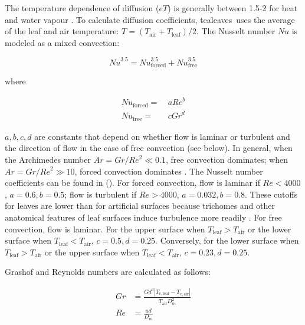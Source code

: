 \documentclass[11pt, oneside]{article}
\newcommand{\pkg}[1]{{\fontseries{b}\selectfont #1}}
\newcommand{\tealeaves}{\pkg{tealeaves}}
\begin{document}
The temperature dependence of diffusion ($\mathit{eT}$) is generally between 1.5-2 for heat and water vapour \citep{Monteith_Unsworth_2013}. To calculate diffusion coefficients, \tealeaves~uses the average of the leaf and air temperature: $T = (T_\mathrm{air} + T_\mathrm{leaf}) / 2$. The Nusselt number $\mathit{Nu}$ is modeled as a mixed convection:

\begin{equation}
  \label{eq:nusselt}
  \mathit{Nu} ^ {3.5} = \mathit{Nu}_\mathrm{forced} ^ {3.5} + \mathit{Nu}_\mathrm{free} ^ {3.5}
\end{equation}

where

\begin{align}
  \mathit{Nu}_\mathrm{forced} =  & ~ a \mathit{Re} ^ b \\
  \mathit{Nu}_\mathrm{free} =    & ~ c \mathit{Gr} ^ d
\end{align}

$a, b, c, d$ are constants that depend on whether flow is laminar or turbulent and the direction of flow in the case of free convection (see below). In general, when the Archimedes number $\mathit{Ar} = \mathit{Gr} / \mathit{Re} ^ 2 \ll 0.1$, free convection dominates; when $\mathit{Ar} = \mathit{Gr} / \mathit{Re} ^ 2 \gg 10$, forced convection dominates \citep{Nobel_2009}. The Nusselt number coefficients can be found in \citeauthor{Monteith_Unsworth_2013} (\citeyear{Monteith_Unsworth_2013}). For forced convection, flow is laminar if $\mathit{Re} < 4000$, $a = 0.6, b = 0.5$; flow is turbulent if $\mathit{Re} > 4000$, $a = 0.032, b = 0.8$. These cutoffs for leaves are lower than for artificial surfaces because trichomes and other anatomical features of leaf surfaces induce turbulence more readily \citep{Grace_Wilson_1976}. For free convection, flow is laminar. For the upper surface when $T_\mathrm{leaf} > T_\mathrm{air}$ or the lower surface when $T_\mathrm{leaf} < T_\mathrm{air}$, $c = 0.5, d = 0.25$. Conversely, for the lower surface when $T_\mathrm{leaf} > T_\mathrm{air}$ or the upper surface when $T_\mathrm{leaf} < T_\mathrm{air}$, $c = 0.23, d = 0.25$.

Grashof and Reynolds numbers are calculated as follows:

\begin{align}
  \mathit{Gr} & = \frac{G d ^ 3 |T_{v,\mathrm{leaf}} - T_{v,\mathrm{air}}|}{T_\mathrm{air} D_m ^ 2} \\
  \mathit{Re} & = \frac{u d}{D_m}
\end{align}
\end{document}
